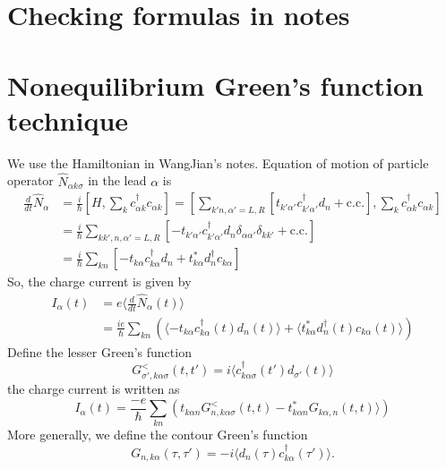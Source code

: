 \documentclass[11pt,a4paper]{book}
\begin{document}
\section{Checking formulas in notes}
% 
\section{Nonequilibrium Green's function technique}
We use the Hamiltonian in WangJian's notes. Equation of motion of particle operator $\hat{N}_{\alpha k\sigma}$ in the lead $\alpha$ is
\begin{equation}
\begin{split}
\frac{d}{dt}\hat{N}_{\alpha} &= \frac{i}{\hbar}[H, \sum_{k}c_{\alpha k}^{\dag}c_{\alpha k}] = \left[\sum_{k'n, \alpha'=L, R}\left[t_{k' \alpha'} c_{k' \alpha'}^{\dag} d_{n}+\mathrm{c.c.}\right], \sum_{k}c_{\alpha k}^{\dag}c_{\alpha k}\right]\\
&=\frac{i}{\hbar}\sum_{kk',n, \alpha'=L, R}\left[ -t_{k' \alpha'} c_{k' \alpha' }^{\dag} d_{n}\delta_{\alpha\alpha'}\delta_{kk'}+\mathrm{c.c.}\right]\\
&=\frac{i}{\hbar}\sum_{kn}[-t_{k \alpha} c_{k \alpha}^{\dag} d_{n} + t_{k \alpha}^{*} d_{n}^{\dag}c_{k \alpha}]
\end{split}
\end{equation}
So, the charge current is given by
\begin{equation}
\begin{split}
I_{\alpha}(t) &= e\langle\frac{d}{dt}\hat{N}_{\alpha}(t)\rangle \\
&=\frac{ie}{\hbar}\sum_{kn}(\langle -t_{k \alpha} c_{k \alpha}^{\dag}(t) d_{n}(t)\rangle + \langle t_{k \alpha}^{*} d_{n}^{\dag}(t)c_{k \alpha}(t)\rangle)
\end{split}
\end{equation}
Define the lesser Green's function
\begin{equation}
G_{\sigma',k\alpha\sigma}^{<}(t,t') = i\langle c_{k\alpha\sigma}^{\dag}(t') d_{\sigma'}(t)\rangle 
\end{equation}
the charge current is written as
\begin{equation}
I_{\alpha}(t)=\frac{-e}{\hbar}\sum_{kn}(t_{k\alpha n}G_{n,k\alpha\sigma}^{<}(t,t) - t_{k \alpha n}^{*} G_{k\alpha,n}(t,t)\rangle)
\end{equation}
More generally, we define the contour Green's function
\begin{equation}
G_{n,k\alpha}(\tau,\tau') = -i\langle  d_{n}(\tau) c_{k\alpha}^{\dag}(\tau')\rangle .
\end{equation}
\end{document}
